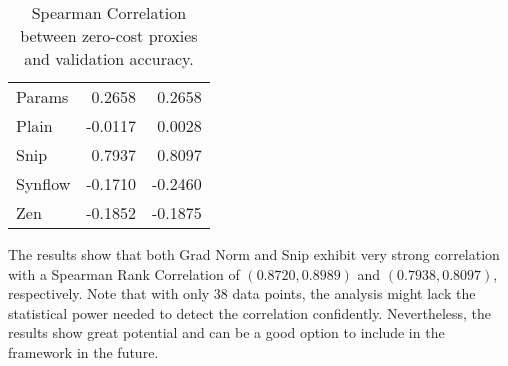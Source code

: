 \begin{table}[!h]
{\begin{tabular}{l|rr}
        \cellcolor[HTML]{EFEFEF}Params     & \cellcolor[HTML]{EFEFEF}0.2658  & \cellcolor[HTML]{EFEFEF}0.2658  \\ 
        Plain      & -0.0117                         & 0.0028                          \\ 
        \cellcolor[HTML]{EFEFEF}Snip       & \cellcolor[HTML]{EFEFEF}0.7937  & \cellcolor[HTML]{EFEFEF}0.8097  \\ 
        Synflow    & -0.1710                         & -0.2460                         \\ 
        \cellcolor[HTML]{EFEFEF}Zen        & \cellcolor[HTML]{EFEFEF}-0.1852 & \cellcolor[HTML]{EFEFEF}-0.1875
    \end{tabular}}
    \caption[]{Spearman Correlation between zero-cost proxies and validation accuracy.}
    \label{tab:gnn-nac-zc}
\end{table}

The results show that both Grad Norm and Snip exhibit very strong correlation with a Spearman Rank Correlation of $(0.8720, 0.8989)$ and $(0.7938, 0.8097)$, respectively. Note that with only 38 data points, the analysis might lack the statistical power needed to detect the correlation confidently. Nevertheless, the results show great potential and can be a good option to include in the framework in the future. 

